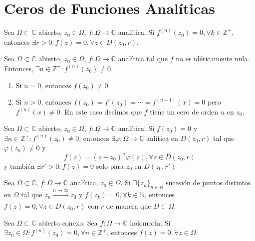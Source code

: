 \section{Ceros de Funciones Analíticas}

\begin{prop}
  Sea $\Omega \subset \mathbb{C}$ abierto, $z_{0} \in \Omega$, $f : \Omega \to \mathbb{C}$ analítica. Si $f^{(n)}(z_{0}) = 0, \forall k \in \mathbb{Z}^{+}$, entonces $\exists r>0 : f(z) = 0, \forall z \in D(z_{0}, r)$.
\end{prop}

\begin{prop}
  Sea $\Omega \subset \mathbb{C}$ abierto, $z_{0} \in \Omega$, $f : \Omega \to \mathbb{C}$ analítica tal que $f$ no es idéticamente nula. Entonces, $ \exists n \in \mathbb{Z}^+ : f^{(n)}(z_{0}) \neq 0$.
  \begin{enumerate}[label=(\roman*)]
    \item Si $n=0$, entonces $f(z_{0}) \neq 0$.
    \item Si $n >0$, entonces $f(z_{0}) = f'(z_{0}) = \cdots = f^{(n-1)}(x) = 0$ pero $f^{(n)}(x) \neq 0$. En este caso decimos que $f$ tiene un cero de orden $n$ en $z_{0}$.
  \end{enumerate}
\end{prop}

\begin{cor}
  Sea $\Omega \subset \mathbb{C}$ abierto, $z_{0} \in \Omega$, $f : \Omega \to \mathbb{C}$ analítica. Si $f(z_{0}) = 0$ y $ \exists n \in \mathbb{Z}^+ : f^{(n)}(z_{0}) \neq 0$, entonces $\exists \varphi : \Omega \to \mathbb{C}$ anlítica en $D(z_{0}, r)$ tal que $\varphi(z_{0}) \neq 0$ y 
  \[ 
    f(z) = (z - z_{0})^{n} \varphi(z), \forall z \in D(z_{0}, r)
  \] 
  y también $\exists r' >0 : f(z) = 0$ solo para $z_{0}$ en $D(z_{0}, r')$ 
\end{cor}

\begin{cor}
  Sea $\Omega \subset \mathbb{C}$, $f : \Omega \to \mathbb{C}$ analítica, $z_{0} \in \Omega$. Si $\exists \{ z_{n} \}_{n \in \mathbb{N}}$ sucesión de puntos distintos en $\Omega$ tal que $z_{n} \xrightarrow[]{ n \rightarrow \infty } z_{0}$ y $f(z_{k}) = 0, \forall k \in \mathbb{N}$, entonces $f(z) = 0, \forall z \in D(z_{0}, r )$ con $r$ de manera que $D \subset \Omega$.
\end{cor}

\begin{prop}
  Sea $\Omega \subset \mathbb{C}$ abierto conexo. Sea $f : \Omega \to \mathbb{C}$ holomorfa. Si $\exists z_{0} \in \Omega: f^{(n)}(z_{0}) = 0, \forall n \in \mathbb{Z}^+$, entonces $f(z) = 0, \forall z \in \Omega$.
\end{prop}

